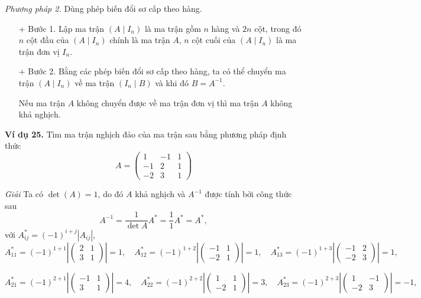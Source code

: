 \textit{Phương pháp 2.} Dùng phép biến đổi sơ cấp theo hàng.
\begin{itemize}
    \item[+] Bước 1. Lập ma trận \((A \mid I_n)\) là ma trận gồm \(n\) hàng và \(2n\) cột, trong đó \(n\) cột đầu của \((A \mid I_n)\) chính là ma trận \(A\), \(n\) cột cuối của \((A \mid I_n)\) là ma trận đơn vị \(I_n\).
    \item[+] Bước 2. Bằng các phép biến đổi sơ cấp theo hàng, ta có thể chuyển ma trận \((A \mid I_n)\) về ma trận \((I_n \mid B)\) và khi đó \(B = A^{-1}\).

    Nếu ma trận \(A\) không chuyển được về ma trận đơn vị thì ma trận \(A\) không khả nghịch.
\end{itemize}

\textbf{Ví dụ 25.} Tìm ma trận nghịch đảo của ma trận sau bằng phương pháp định thức
\[
A = \begin{pmatrix}
1 & -1 & 1 \\
-1 & 2 & 1 \\
-2 & 3 & 1
\end{pmatrix}
\]

\textit{Giải}
Ta có \(\det(A) = 1\), do đó \(A\) khả nghịch và \(A^{-1}\) được tính bởi công thức sau
\[
A^{-1} = \frac{1}{\det A} A^* = \frac{1}{1} A^* = A^*,
\]
với \(A_{ij}^* = (-1)^{i+j} \left|A_{ij}\right|\),
\[
A_{11}^* = (-1)^{1+1} \left| \begin{pmatrix}
2 & 1 \\
3 & 1
\end{pmatrix} \right| = 1, \quad A_{12}^* = (-1)^{1+2} \left| \begin{pmatrix}
-1 & 1 \\
-2 & 1
\end{pmatrix} \right| = 1, \quad A_{13}^* = (-1)^{1+3} \left| \begin{pmatrix}
-1 & 2 \\
-2 & 3
\end{pmatrix} \right| = 1,
\]

\[
A_{21}^* = (-1)^{2+1} \left| \begin{pmatrix}
-1 & 1 \\
3 & 1
\end{pmatrix} \right| = 4, \quad A_{22}^* = (-1)^{2+2} \left| \begin{pmatrix}
1 & 1 \\
-2 & 1
\end{pmatrix} \right| = 3, \quad A_{23}^* = (-1)^{2+3} \left| \begin{pmatrix}
1 & -1 \\
-2 & 3
\end{pmatrix} \right| = -1,
\]

